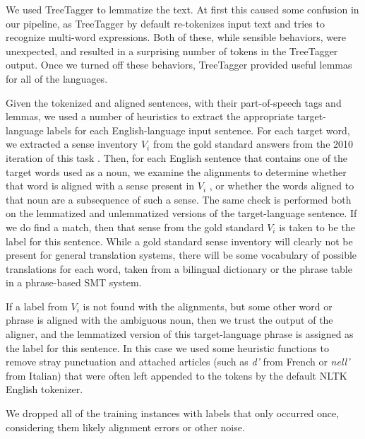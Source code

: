 \documentclass[11pt,letterpaper]{article}
\begin{document}
We used TreeTagger \cite{Schmid95improvementsin} to lemmatize the text. At
first this caused some confusion in our pipeline, as TreeTagger by default
re-tokenizes input text and tries to recognize multi-word expressions. Both of
these, while sensible behaviors, were unexpected, and resulted in a surprising 
number of tokens in the TreeTagger output. Once we turned off these behaviors,
TreeTagger provided useful lemmas for all of the languages.

Given the tokenized and aligned sentences, with their part-of-speech tags and
lemmas, we used a number of heuristics to extract the appropriate
target-language labels for each English-language input sentence.  For each
target word, we extracted a sense inventory $V_i$ from the gold standard
answers from the 2010 iteration of this task \cite{lefever-hoste:2009:SEW}.
Then, for each English sentence that contains one of the target words used as a noun,
we examine the alignments to determine whether that word is aligned with a
sense present in $V_i$ , or whether the words aligned to that noun are a
subsequence of such a sense. The same check is performed both on the lemmatized
and unlemmatized versions of the target-language sentence. If we do find a
match, then that sense from the gold standard $V_i$ is taken to be the label
for this sentence. While a gold standard sense inventory will clearly not be
present for general translation systems, there will be some vocabulary of
possible translations for each word, taken from a bilingual dictionary or the
phrase table in a phrase-based SMT system.

If a label from $V_i$ is not found with the alignments, but some other word or
phrase is aligned with the ambiguous noun, then we trust the output of the
aligner, and the lemmatized version of this target-language phrase is assigned
as the label for this sentence. In this case we used some heuristic functions
to remove stray punctuation and attached articles (such as \emph{d'} from
French or \emph{nell'} from Italian) that were often left appended to the
tokens by the default NLTK English tokenizer.

We dropped all of the training instances with labels that only occurred once,
considering them likely alignment errors or other noise.
\end{document}
